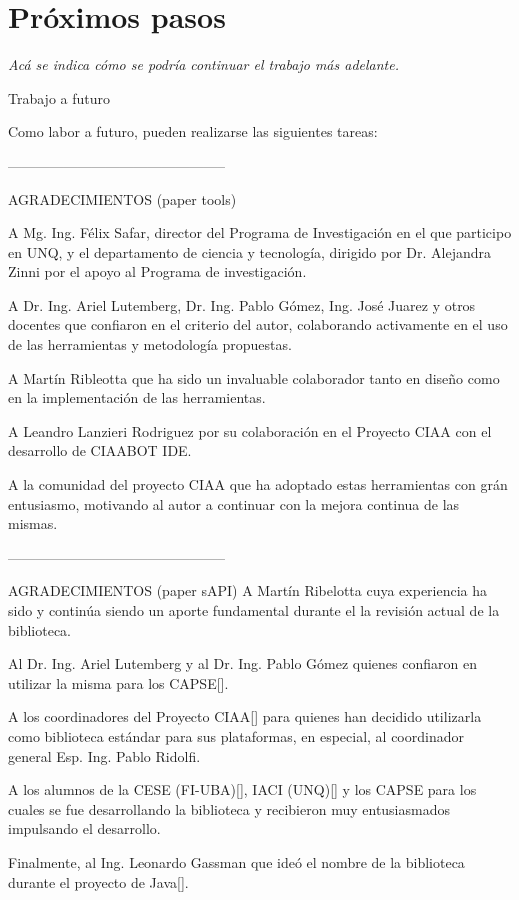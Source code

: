 \section{Próximos pasos}

\emph{Acá se indica cómo se podría continuar el trabajo más adelante.}


Trabajo a futuro

Como labor a futuro, pueden realizarse las siguientes tareas:


-----------------------------------------------

AGRADECIMIENTOS (paper tools)

A Mg. Ing. Félix Safar, director del Programa de
Investigación en el que participo en UNQ, y el departamento
de ciencia y tecnología, dirigido por Dr. Alejandra Zinni por el
apoyo al Programa de investigación.

A Dr. Ing. Ariel Lutemberg, Dr. Ing. Pablo Gómez, Ing.
José Juarez y otros docentes que confiaron en el criterio del
autor, colaborando activamente en el uso de las herramientas y
metodología propuestas.

A Martín Ribleotta que ha sido un invaluable colaborador
tanto en diseño como en la implementación de las
herramientas.

A Leandro Lanzieri Rodriguez por su colaboración en el
Proyecto CIAA con el desarrollo de CIAABOT IDE.

A la comunidad del proyecto CIAA que ha adoptado estas
herramientas con grán entusiasmo, motivando al autor a
continuar con la mejora continua de las mismas.

-----------------------------------------------

AGRADECIMIENTOS  (paper sAPI)
A Martín Ribelotta cuya experiencia ha sido y continúa siendo un aporte fundamental durante el la revisión actual de la biblioteca.

Al Dr. Ing. Ariel Lutemberg y al Dr. Ing. Pablo Gómez quienes confiaron en utilizar la misma para los CAPSE[].

A los coordinadores del Proyecto CIAA[] para quienes han decidido utilizarla como biblioteca estándar para sus plataformas, en especial, al coordinador general Esp. Ing. Pablo Ridolfi.

A los alumnos de la CESE (FI-UBA)[], IACI (UNQ)[] y los CAPSE para los cuales se fue desarrollando la biblioteca y recibieron muy entusiasmados impulsando el desarrollo.

Finalmente, al Ing. Leonardo Gassman que ideó el nombre de la biblioteca durante el proyecto de Java[].



